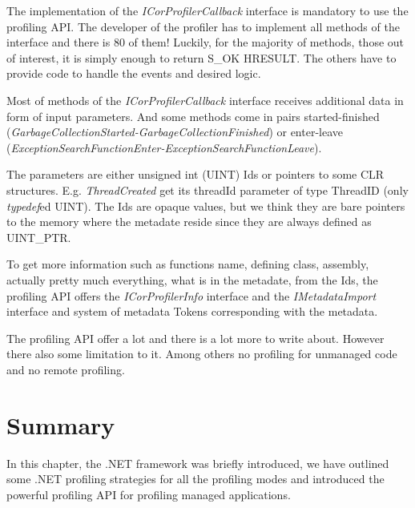 The implementation of the \textit{ICorProfilerCallback} interface is mandatory to use the profiling API. The developer of the profiler has to implement all methods of the interface and there is 80 of them! Luckily, for the majority of methods, those out of interest, it is simply enough to return S\_OK HRESULT. The others have to provide code to handle the events and desired logic.

Most of methods of the \textit{ICorProfilerCallback} interface receives additional data in form of input parameters. And some methods come in pairs started-finished (\textit{GarbageCollectionStarted-GarbageCollectionFinished}) or enter-leave (\textit{ExceptionSearchFunctionEnter-ExceptionSearchFunctionLeave}). 

The parameters are either unsigned int (UINT) Ids or pointers to some CLR structures. E.g. \textit{ThreadCreated} get its threadId parameter of type ThreadID (only \textit{typedef}ed UINT). The Ids are opaque values, but we think they are bare pointers to the memory where the metadate reside since they are always defined as UINT\_PTR.

To get more information such as functions name, defining class, assembly, actually pretty much everything, what is in the metadate, from the Ids, the profiling API offers the \textit{ICorProfilerInfo} interface and the \textit{IMetadataImport} interface and system of metadata Tokens corresponding with the metadata.

The profiling API offer a lot and there is a lot more to write about. However there also some limitation to it. Among others no profiling for unmanaged code and no remote profiling. 

\section{Summary}
In this chapter, the .NET framework was briefly introduced, we have outlined some .NET profiling strategies for all the profiling modes and introduced the powerful profiling API for profiling managed applications.
